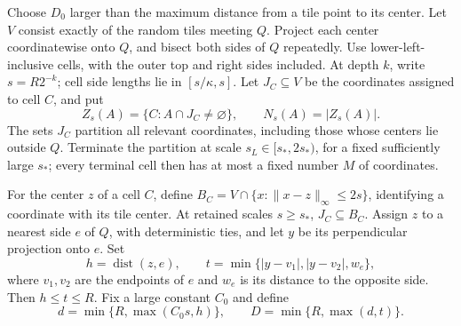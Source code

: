 Choose $D_0$ larger than the maximum distance from a tile point to its center. Let $V$ consist exactly of the random tiles meeting $Q$. Project each center coordinatewise onto $Q$, and bisect both sides of $Q$ repeatedly. Use lower-left-inclusive cells, with the outer top and right sides included. At depth $k$, write $s=R2^{-k}$; cell side lengths lie in $[s/\kappa,s]$. Let $J_C\subseteq V$ be the coordinates assigned to cell $C$, and put
\[
 Z_s(A)=\{C:A\cap J_C\ne\varnothing\},\qquad N_s(A)=|Z_s(A)|.
\]
The sets $J_C$ partition all relevant coordinates, including those whose centers lie outside $Q$. Terminate the partition at scale $s_L\in[s_*,2s_*)$, for a fixed sufficiently large $s_*$; every terminal cell then has at most a fixed number $M$ of coordinates.

For the center $z$ of a cell $C$, define $B_C=V\cap\{x:\|x-z\|_\infty\le2s\}$, identifying a coordinate with its tile center. At retained scales $s\ge s_*$, $J_C\subseteq B_C$. Assign $z$ to a nearest side $e$ of $Q$, with deterministic ties, and let $y$ be its perpendicular projection onto $e$. Set
\[
 h=\operatorname{dist}(z,e),\qquad
 t=\min\{|y-v_1|,|y-v_2|,w_e\},
\]
where $v_1,v_2$ are the endpoints of $e$ and $w_e$ is its distance to the opposite side.
Then $h\le t\le R$. Fix a large constant $C_0$ and define
\[
 d=\min\{R,\max(C_0s,h)\},\qquad
 D=\min\{R,\max(d,t)\}.
\]

